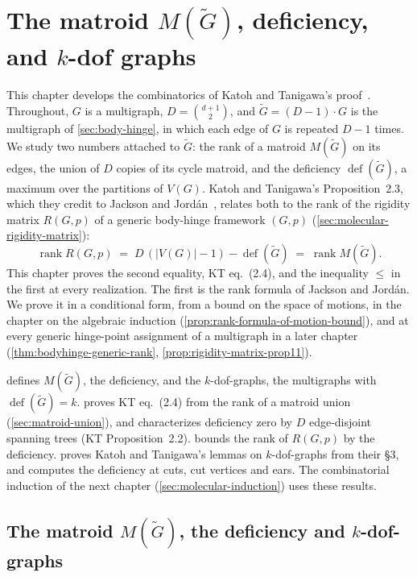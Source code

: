 \section{The matroid \texorpdfstring{$M(\tilde G)$}{M(G~)}, deficiency, and \texorpdfstring{$k$}{k}-dof graphs}
\label{sec:molecular-deficiency}

This chapter develops the combinatorics of Katoh and Tanigawa's
proof~\cite[\S2.5 and \S3]{katohTanigawa2011}. Throughout, $G$ is a
multigraph, $D = \binom{d+1}{2}$, and $\tilde G = (D-1)\cdot G$ is the
multigraph of \cref{sec:body-hinge}, in which each edge of $G$ is
repeated $D - 1$ times. We study two numbers attached to $\tilde G$: the
rank of a matroid $M(\tilde G)$ on its edges, the union of $D$ copies of
its cycle matroid, and the deficiency $\operatorname{def}(\tilde G)$, a
maximum over the partitions of $V(G)$. Katoh and Tanigawa's
Proposition~2.3, which they credit to Jackson and
Jord\'an~\cite{jacksonJordan2009}, relates both to the rank of the
rigidity matrix $R(G,p)$ of a generic body-hinge framework $(G,p)$
(\cref{sec:molecular-rigidity-matrix}):
\[
  \operatorname{rank} R(G,p) \;=\;
  D\,(|V(G)| - 1) - \operatorname{def}(\tilde G) \;=\;
  \operatorname{rank} M(\tilde G).
\]
This chapter proves the second equality, KT eq.~(2.4), and the
inequality $\le$ in the first at every realization. The first is the
rank formula of Jackson and Jord\'an. We prove it in a conditional form,
from a bound on the space of motions, in the chapter on the algebraic
induction (\cref{prop:rank-formula-of-motion-bound}), and at every generic
hinge-point assignment of a multigraph in a later chapter
(\cref{thm:bodyhinge-generic-rank}, \cref{prop:rigidity-matrix-prop11}).

 defines $M(\tilde G)$, the
deficiency, and the $k$-dof-graphs, the multigraphs with
$\operatorname{def}(\tilde G) = k$. 
proves KT eq.~(2.4) from the rank of a matroid union
(\cref{sec:matroid-union}), and characterizes deficiency zero by $D$
edge-disjoint spanning trees (KT Proposition~2.2).
 bounds the rank of $R(G,p)$
by the deficiency.  proves Katoh
and Tanigawa's lemmas on $k$-dof-graphs from their \S3, and computes
the deficiency at cuts, cut vertices and ears. The combinatorial
induction of the next chapter (\cref{sec:molecular-induction}) uses
these results.

\subsection{The matroid \texorpdfstring{$M(\tilde G)$}{M(G~)}, the deficiency and \texorpdfstring{$k$}{k}-dof-graphs}
\label{sec:molecular-deficiency-matroid}

